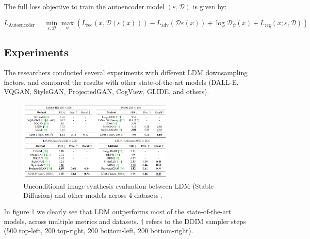 The full loss objective to train the autoencoder model $(\varepsilon, \mathcal{D})$ is given by:

\begin{equation*}
    L_{\text{Autoencoder}} = \min_{\varepsilon, \mathcal{D}} \max_{\psi} \left( L_{\text{rec}} (x, \mathcal{D} (\varepsilon (x))) - L_{\text{adv}} (\mathcal{D} \varepsilon (x)) + \log \mathcal{D}_\psi (x) + L_{\text{reg}} (x; \varepsilon, \mathcal{D}) \right)
\end{equation*}


















\subsection{Experiments}

The researchers conducted several experiments with different LDM downsampling factors, and compared the results with other state-of-the-art models (DALL-E, VQGAN, StyleGAN, ProjectedGAN, CogView, GLIDE, and others).

\begin{figure}
    \centering
    \includegraphics[width=0.7\textwidth]{images/diffusion_models/stable_diffusion/experiments_1.png}
    \caption{Unconditional image synthesis evaluation between LDM (Stable Diffusion) and other models across 4 datasets \cite{stable_diffusion}.}
    \label{fig:stable_diffusion_experiments_unconditional}
\end{figure}

In figure \ref{fig:stable_diffusion_experiments_unconditional} we clearly see that LDM outperforms most of the state-of-the-art models, across multiple metrics and datasets. $\dagger$ refers to the DDIM sampler steps (500 top-left, 200 top-right, 200 bottom-left, 200 bottom-right).

